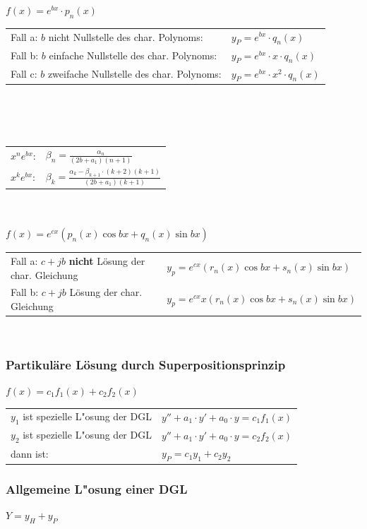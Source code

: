 \underline{$f(x)=e^{bx}\cdot p_n(x)$} \\
\begin{tabular}{p{8cm}p{4cm}}
Fall a: $b$ nicht Nullstelle des char. Polynoms:    &
$y_P=e^{bx}\cdot q_n(x)$\\
Fall b: $b$ einfache Nullstelle des char. Polynoms: &
$y_P=e^{bx}\cdot x \cdot q_n(x)$\\
Fall c: $b$ zweifache Nullstelle des char. Polynoms: &
$y_P=e^{bx}\cdot x^2\cdot q_n(x)$
\end{tabular}\\ \\ \\
\begin{tabular}{p{2cm}p{9cm}}
$x^n e^{bx}$: & $\beta_n = \frac{\alpha_n}{(2b+a_1)(n+1)}$ \\
$x^k e^{bx}$: & $\beta_k = \frac{\alpha_k - \beta_{k+1} \cdot (k+2)(k+1)}{(2b+a_1)(k+1)}$
\end{tabular} \\ \\

\underline{$f(x)=e^{cx}(p_n(x)\cos{bx}+q_n(x)\sin{bx})$}\\
\begin{tabular}{p{8cm}p{8cm}}
Fall a: $c+jb$ \textbf{nicht} Lösung der char. Gleichung &
$y_p=e^{cx}(r_n(x)\cos{bx}+s_n(x)\sin{bx})$ \\
Fall b: $c+jb$ Lösung der char. Gleichung &
$y_p=e^{cx}x(r_n(x)\cos{bx}+s_n(x)\sin{bx})$\\
\end{tabular}\\

\subsubsection{Partikuläre Lösung durch Superpositionsprinzip}
$f(x)=c_1f_1(x)+c_2f_2(x)$\\
\begin{tabular}{p{8cm}p{4cm}}
$y_1$ ist spezielle L"osung der DGL &
$y''+a_1\cdot y'+a_0\cdot y=c_1f_1(x)$ \\
$y_2$ ist spezielle L"osung der DGL &
$y''+a_1\cdot y'+a_0\cdot y=c_2f_2(x)$ \\
dann ist:                          &
$y_P=c_1y_1+c_2y_2$\\
\end{tabular}

\subsubsection{Allgemeine L"osung einer DGL}
$Y=y_H+y_P$

